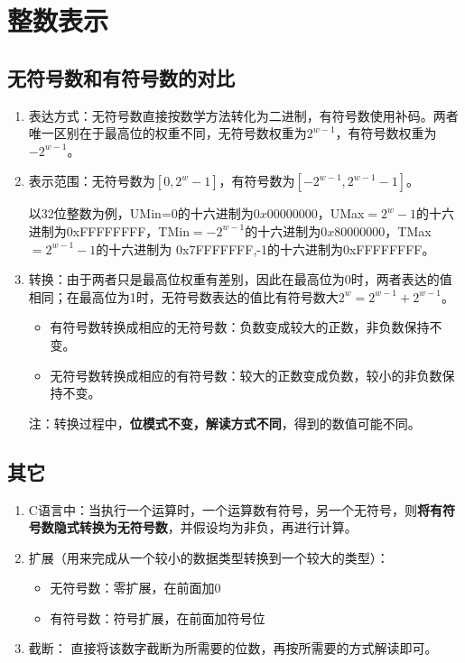 \documentclass[twoside]{ctexart}
\begin{document}
    \section{整数表示}

    \subsection{无符号数和有符号数的对比}
    \begin{enumerate}
        \item 表达方式：无符号数直接按数学方法转化为二进制，有符号数使用补码。两者唯一区别在于最高位的权重不同，无符号数权重为$2^{w-1}$，有符号数权重为$-2^{w-1}$。
        \item 表示范围：无符号数为$[0,2^{w}-1]$，有符号数为$[-2^{w-1},2^{w-1}-1]$。
        
        以32位整数为例，UMin=0的十六进制为$0x00000000$，UMax$=2^w-1$的十六进制为0xFFFFFFFF，TMin$=-2^{w-1}$的十六进制为$0x80000000$，TMax$=2^{w-1}-1$的十六进制为 0x7FFFFFFF,-1的十六进制为0xFFFFFFFF。
        
        \item 转换：由于两者只是最高位权重有差别，因此在最高位为0时，两者表达的值相同；在最高位为1时，无符号数表达的值比有符号数大$2^w=2^{w-1}+2^{w-1}$。
        \begin{itemize}
        \item 有符号数转换成相应的无符号数：负数变成较大的正数，非负数保持不变。
        \item 无符号数转换成相应的有符号数：较大的正数变成负数，较小的非负数保持不变。
    \end{itemize}
    注：转换过程中，\textbf{位模式不变，解读方式不同}，得到的数值可能不同。
        
    \end{enumerate}

    \subsection{其它}
    \begin{enumerate}
        \item 
    C语言中：当执行一个运算时，一个运算数有符号，另一个无符号，则\textbf{将有符号数隐式转换为无符号数}，并假设均为非负，再进行计算。
    \item 扩展（用来完成从一个较小的数据类型转换到一个较大的类型）：
    \begin{itemize}
        \item 无符号数：零扩展，在前面加0
        \item 有符号数：符号扩展，在前面加符号位
    \end{itemize}
    \item 截断：
    直接将该数字截断为所需要的位数，再按所需要的方式解读即可。
    \end{enumerate}
    
\end{document}
